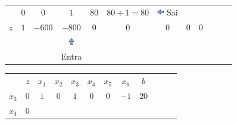 \begin{frame}
{\begin{table}
\begin{tabular}{c c c c c c c c c c c c}
				& \cellcolor{gray!60}  $ \scriptstyle 0$
				& \cellcolor{gray!60}  $ \scriptstyle 0$
				& \cellcolor{gray!60}  $ \scriptstyle 1$ 
				& \cellcolor{gray!60}  $ \scriptstyle 80$ 
				& $ \scriptstyle 80 \div 1 = 80$
				& \includegraphics[width=0.3cm,height=0.3cm]{setaesquerda.jpg} \scriptsize Sai\\
				\cellcolor{blue!80} \color{white} $ \scriptstyle z$
				& \cellcolor{yellow!60}  $ \scriptstyle 1$
				& \cellcolor{yellow!60}  $ \scriptstyle -600$ 
				& \cellcolor{gray!60}  $ \scriptstyle -800$
				& \cellcolor{yellow!60}  $ \scriptstyle 0$
				& \cellcolor{yellow!60}  $ \scriptstyle 0$
				& \cellcolor{yellow!60}  $ \scriptstyle 0$
				& \cellcolor{yellow!60}  $ \scriptstyle 0$ 
				& \cellcolor{gray!60}  $ \scriptstyle 0$ \\
				& & & \includegraphics[width=0.3cm,height=0.3cm]{setacima.jpg} \\
				& & & \scriptsize Entra \\
			\end{tabular}
		\end{table}	
	}	
	{
		\begin{table}
			\begin{tabular}{c c c c c c c c c c c c}
				& \cellcolor{blue!80} \color{white} $ \scriptstyle z$
				& \cellcolor{blue!80} \color{white} $ \scriptstyle x_1$ 
				& \cellcolor{blue!80} \color{red} $ \scriptstyle x_2$
				& \cellcolor{blue!80} \color{red} $ \scriptstyle x_3$
				& \cellcolor{blue!80} \color{red} $ \scriptstyle x_4$
				& \cellcolor{blue!80} \color{red} $ \scriptstyle x_5$
				& \cellcolor{blue!80} \color{white} $ \scriptstyle x_6$ 
				& \cellcolor{blue!80} \color{white} $ \scriptstyle b$ \\
				\cellcolor{blue!80} \color{red} $ \scriptstyle x_3$
				& \cellcolor{yellow!60}  $ \scriptstyle 0$
				& \cellcolor{yellow!60}  $ \scriptstyle 1$ 
				& \cellcolor{yellow!60}  $ \scriptstyle 0$
				& \cellcolor{yellow!60}  $ \scriptstyle 1$
				& \cellcolor{yellow!60}  $ \scriptstyle 0$
				& \cellcolor{yellow!60}  $ \scriptstyle 0$
				& \cellcolor{yellow!60}  $ \scriptstyle -1$ 
				& \cellcolor{yellow!60}  $ \scriptstyle 20$ \\ 
				\cellcolor{blue!80} \color{red} $ \scriptstyle x_4$
				& \cellcolor{yellow!60}  $ \scriptstyle 0$

\end{tabular}
\end{table}}
\end{frame}
